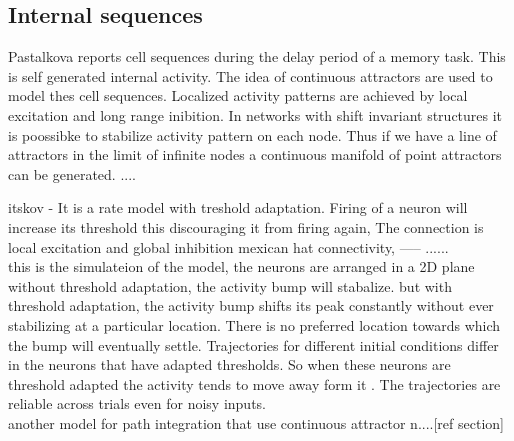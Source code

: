 \subsection{Internal sequences}
Pastalkova reports cell sequences during the delay period of a memory task. This is self generated internal activity. The idea of continuous attractors are used to model thes cell sequences. Localized activity patterns are achieved by local excitation and long range inibition. In networks  with shift invariant structures it is poossibke to stabilize activity pattern on each node. Thus if we have a line of attractors in the limit of infinite nodes a continuous manifold of point attractors can be generated.  ....

itskov  - It is a rate model with treshold adaptation. Firing of a neuron will increase its threshold this discouraging it from firing again, The connection is local excitation and global inhibition mexican hat connectivity, ----- ......\\
this is the simulateion of the model, the neurons are arranged in a  2D plane without threshold adaptation, the activity bump will stabalize. but with threshold adaptation, the activity bump shifts its peak constantly without ever stabilizing at a particular location. There is no preferred location towards which the bump will eventually settle. Trajectories for different initial conditions differ in the neurons that have adapted thresholds. So when these neurons are threshold adapted the activity tends to move away form it . The trajectories are reliable across trials even for noisy inputs. \\ another model for path integration that use continuous attractor n....[ref section]
